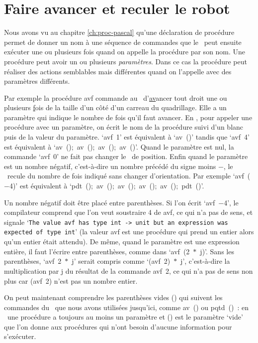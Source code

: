 \section{Faire avancer et reculer le robot}

Nous avons vu au chapitre \ref{ch:proc-pascal} qu'une déclaration de 
procédure permet de donner un nom à une séquence de commandes que le 
\robot\ peut ensuite exécuter une ou plusieurs fois quand on appelle la procédure par son  nom.
Une procédure peut avoir un ou plusieurs {\em paramètres}.  Dans ce cas la procédure
peut réaliser des actions semblables mais différentes quand on l'appelle avec des paramètres
différents.

Par exemple la procédure
 {\idt avf} commande au \robot\ d'\underline{av}ancer tout droit une
ou plusieurs \underline{f}ois de la taille d'un côté d'un carreau du quadrillage.
Elle a un paramètre qui indique le nombre de fois qu'il faut avancer.
En \ocaml, pour appeler une procédure avec un paramètre, on écrit le nom de la procédure suivi
d'un blanc puis de la valeur du paramètre.
`{\idt avf\ 1}' est équivalent à `{\idt av\ ()}' tandis que
`{\idt avf\ 4}' est équivalent à `{\idt av\ ();\ av\ ();\ av\ ();\ av\ ()}'.
Quand le paramètre est nul, la commande `{\idt avf\ 0}' ne fait pas changer le \robot\ de position.
Enfin quand le paramètre est un nombre négatif, c'est-à-dire un nombre précédé du
signe moins $-$, le \robot\ recule du nombre de fois indiqué sans changer d'orientation. Par exemple
`{\idt avf\ ($-$4)}' est équivalent à `{\idt pdt\ ();\ av\ ();\ av\ ();\ av\ ();\ av\ ();\ pdt\ ()}'.

Un nombre négatif doit être placé entre parenthèses. Si l'on écrit `{\idt avf\ $-$4}', le
compilateur comprend que l'on veut soustraire 4 de {\idt avf}, ce qui n'a pas de sens, et 
signale `{\tt The value avf has type int -> unit but an expression was expected of type int}'
(la valeur {\idt avf} est une procédure qui prend un entier alors qu'un entier était attendu).
De même, quand le paramètre est une expression entière, il faut l'écrire entre parenthèses, comme
dans `{\idt avf\ (2\ $\ast$\ j)}'. Sans les parenthèses, `{\idt avf\ 2\ $\ast$\ j}' serait compris comme
`{\idt (avf\ 2)\ $\ast$\ j}', c'est-à-dire la multiplication par {\idt j} du résultat de la 
commande {\idt avf\ 2}, ce qui n'a pas de sens non plus car {\idt (avf\ 2)} n'est pas un nombre entier.

On peut maintenant comprendre les parenthèses vides {\idt ()} qui suivent les commandes
du \robot\ que nous avons utilisées jusqu'ici, comme {\idt av\ ()} ou {\idt pqtd\ ()}~: 
en \ocaml\ une procédure a toujours au moins un paramètre et {\idt ()} est le paramètre
`vide' que l'on donne aux procédures qui n'ont besoin d'aucune information pour s'exécuter.

